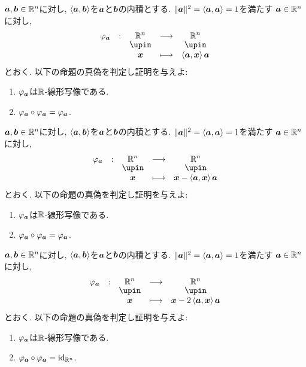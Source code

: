 \begin{quiz}
  $\boldsymbol{a},\boldsymbol{b}\in\mathbb{R}^n$に対し,
  $\Braket{\boldsymbol{a},\boldsymbol{b}}$を$\boldsymbol{a}$と$\boldsymbol{b}$の内積とする.
  $\|\boldsymbol{a}\|^2=\Braket{\boldsymbol{a},\boldsymbol{a}}=1$を満たす
  $\boldsymbol{a}\in\mathbb{R}^n$に対し,
  \begin{align*}
    \shazo{\varphi_{\aaa}}{\RR^n}{\RR^n}
    {\xx}{\braket{\aaa,\xx}\aaa}
  \end{align*}
  とおく.
  以下の命題の真偽を判定し証明を与えよ:
  \begin{enumerate}
  \item $\varphi_{\boldsymbol{a}}$は$\mathbb{R}$-線形写像である.
  \item $\varphi_{\boldsymbol{a}}\circ \varphi_{\boldsymbol{a}}=\varphi_{\boldsymbol{a}}$.
  \end{enumerate}
\end{quiz}
\begin{quiz}
  $\boldsymbol{a},\boldsymbol{b}\in\mathbb{R}^n$に対し,
  $\Braket{\boldsymbol{a},\boldsymbol{b}}$を$\boldsymbol{a}$と$\boldsymbol{b}$の内積とする.
  $\|\boldsymbol{a}\|^2=\Braket{\boldsymbol{a},\boldsymbol{a}}=1$を満たす
  $\boldsymbol{a}\in\mathbb{R}^n$に対し,
  \begin{align*}
    \shazo{\varphi_{\aaa}}{\RR^n}{\RR^n}
    {\xx}{\xx-\braket{\aaa,\xx}\aaa}
  \end{align*}
  とおく.
  以下の命題の真偽を判定し証明を与えよ:
  \begin{enumerate}
  \item $\varphi_{\boldsymbol{a}}$は$\mathbb{R}$-線形写像である.
  \item $\varphi_{\boldsymbol{a}}\circ \varphi_{\boldsymbol{a}}=\varphi_{\boldsymbol{a}}$.
  \end{enumerate}
\end{quiz}

\begin{quiz}
  $\boldsymbol{a},\boldsymbol{b}\in\mathbb{R}^n$に対し,
  $\Braket{\boldsymbol{a},\boldsymbol{b}}$を$\boldsymbol{a}$と$\boldsymbol{b}$の内積とする.
  $\|\boldsymbol{a}\|^2=\Braket{\boldsymbol{a},\boldsymbol{a}}=1$を満たす
  $\boldsymbol{a}\in\mathbb{R}^n$に対し,
  \begin{align*}
    \shazo{\varphi_{\aaa}}{\RR^n}{\RR^n}
    {\xx}{\xx-2\braket{\aaa,\xx}\aaa}
  \end{align*}
  とおく.
  以下の命題の真偽を判定し証明を与えよ:
  \begin{enumerate}
  \item $\varphi_{\boldsymbol{a}}$は$\mathbb{R}$-線形写像である.
  \item $\varphi_{\boldsymbol{a}}\circ \varphi_{\boldsymbol{a}}=\operatorname{id}_{\mathbb{R}^n}$.
  \end{enumerate}
\end{quiz}

